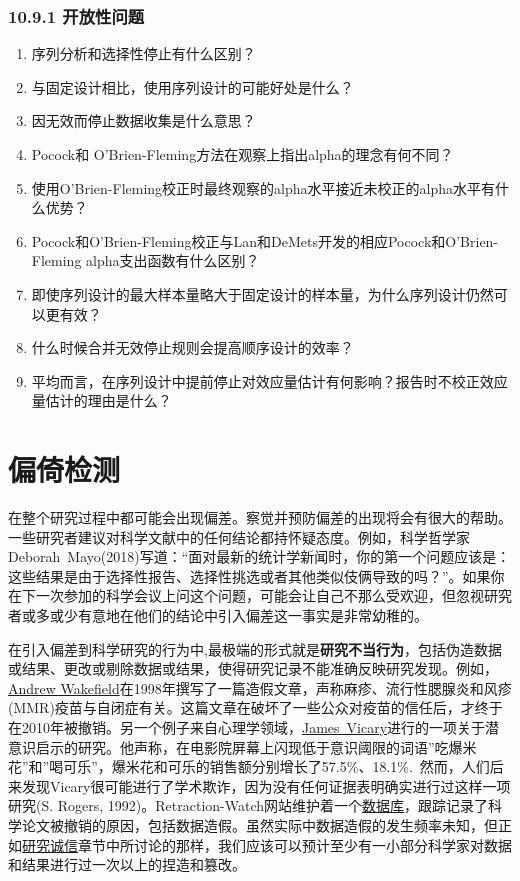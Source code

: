 \documentclass[
  letterpaper,
  DIV=11,
  numbers=noendperiod]{scrreprt}
\begin{document}
\hypertarget{ux5f00ux653eux6027ux95eeux9898-2}{%
\subsection{10.9.1 开放性问题}\label{ux5f00ux653eux6027ux95eeux9898-2}}

\begin{enumerate}
\def\labelenumi{\arabic{enumi}.}
\item
  序列分析和选择性停止有什么区别？
\item
  与固定设计相比，使用序列设计的可能好处是什么？
\item
  因无效而停止数据收集是什么意思？
\item
  Pocock和 O'Brien-Fleming方法在观察上指出alpha的理念有何不同？
\item
  使用O'Brien-Fleming校正时最终观察的alpha水平接近未校正的alpha水平有什么优势？
\item
  Pocock和O'Brien-Fleming校正与Lan和DeMets开发的相应Pocock和O'Brien-Fleming
  alpha支出函数有什么区别？
\item
  即使序列设计的最大样本量略大于固定设计的样本量，为什么序列设计仍然可以更有效？
\item
  什么时候合并无效停止规则会提高顺序设计的效率？
\item
  平均而言，在序列设计中提前停止对效应量估计有何影响？报告时不校正效应量估计的理由是什么？
\end{enumerate}


\hypertarget{sec-bias}{%
\chapter{偏倚检测}\label{sec-bias}}

在整个研究过程中都可能会出现偏差。察觉并预防偏差的出现将会有很大的帮助。一些研究者建议对科学文献中的任何结论都持怀疑态度。例如，科学哲学家Deborah~Mayo(2018)写道：``面对最新的统计学新闻时，你的第一个问题应该是：这些结果是由于选择性报告、选择性挑选或者其他类似伎俩导致的吗？''。如果你在下一次参加的科学会议上问这个问题，可能会让自己不那么受欢迎，但忽视研究者或多或少有意地在他们的结论中引入偏差这一事实是非常幼稚的。

在引入偏差到科学研究的行为中,最极端的形式就是\textbf{研究不当行为}，包括伪造数据或结果、更改或剔除数据或结果，使得研究记录不能准确反映研究发现。例如，\href{https://en.wikipedia.org/wiki/Andrew_Wakefield}{Andrew
Wakefield}在1998年撰写了一篇造假文章，声称麻疹、流行性腮腺炎和风疹(MMR)疫苗与自闭症有关。这篇文章在破坏了一些公众对疫苗的信任后，才终于在2010年被撤销。另一个例子来自心理学领域，\href{https://en.wikipedia.org/wiki/James_Vicary}{James~Vicary}进行的一项关于潜意识启示的研究。他声称，在电影院屏幕上闪现低于意识阈限的词语''吃爆米花''和''喝可乐''，爆米花和可乐的销售额分别增长了57.5\%、18.1\%.~然而，人们后来发现Vicary很可能进行了学术欺诈，因为没有任何证据表明确实进行过这样一项研究(S.
Rogers,
1992)。Retraction-Watch网站维护着一个\href{http://retractiondatabase.org}{数据库}，跟踪记录了科学论文被撤销的原因，包括数据造假。虽然实际中数据造假的发生频率未知，但正如\protect\hyperlink{integrity}{研究诚信}章节中所讨论的那样，我们应该可以预计至少有一小部分科学家对数据和结果进行过一次以上的捏造和篡改。
\end{document}
